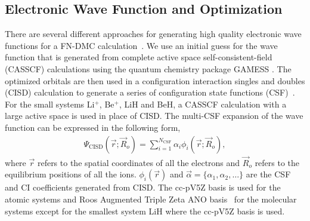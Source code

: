 \documentclass[pra,superscriptaddress,groupedaddress,twocolumn]{revtex4}
\begin{document}
\subsection{Electronic Wave Function and Optimization}

There are several different approaches for generating high quality electronic wave functions for a FN-DMC calculation~\cite{Umrigar_Alleviation,Toulouse_Bench,Brown_Bench,Seth_Bench}. We use an initial guess for the wave function that is generated from complete active space self-consistent-field (CASSCF) \cite{Chaban_MCSCF,Szabo} calculations using the quantum chemistry package GAMESS \cite{GAMESS}. The optimized orbitals are then used in a configuration interaction singles and doubles (CISD) calculation to generate a series of configuration state functions (CSF)~\cite{Pauncz_CSF}. For the small systems Li$^+$, Be$^+$, LiH and BeH, a CASSCF calculation with a large active space is used in place of CISD. The multi-CSF expansion of the wave function can be expressed in the following form,
\begin{align}
\Psi_{\text{CISD}}(\vec{r};\vec{R}_o)=\sum\limits_{i=1}^{N_{\text{CSF}}}\alpha_i\phi_i(\vec{r};\vec{R}_o), \label{eq:psi_gms}
\end{align}
where $\vec{r}$ refers to the spatial coordinates of all the electrons and $\vec{R}_o$ refers to the equilibrium positions of all the ions. $\phi_i(\vec{r})$ and $\vec{\alpha}=\{\alpha_1,\alpha_2,\dots\}$ are the CSF and CI coefficients generated from CISD. The cc-pV5Z basis \cite{dunning} is used for the atomic systems and Roos Augmented Triple Zeta ANO basis~\cite{roos} for the molecular systems except for the smallest system LiH where the cc-pV5Z basis is used.
\end{document}
